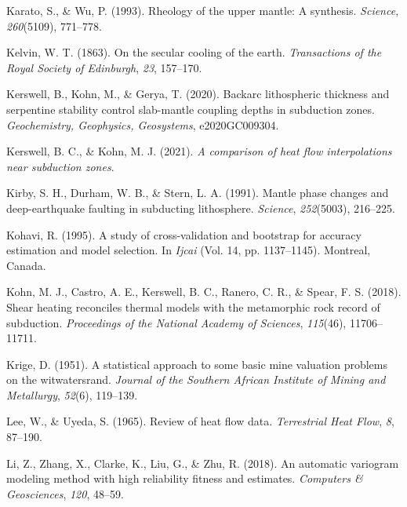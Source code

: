 \begin{CSLReferences}{1}{1}
\leavevmode{}%
Karato, S., \& Wu, P. (1993). Rheology of the upper mantle: A synthesis. \emph{Science}, \emph{260}(5109), 771--778.

\leavevmode{}%
Kelvin, W. T. (1863). On the secular cooling of the earth. \emph{Transactions of the Royal Society of Edinburgh}, \emph{23}, 157--170.

\leavevmode{}%
Kerswell, B., Kohn, M., \& Gerya, T. (2020). Backarc lithospheric thickness and serpentine stability control slab-mantle coupling depths in subduction zones. \emph{Geochemistry, Geophysics, Geosystems}, e2020GC009304.

\leavevmode{}%
Kerswell, B. C., \& Kohn, M. J. (2021). \emph{A comparison of heat flow interpolations near subduction zones}.

\leavevmode{}%
Kirby, S. H., Durham, W. B., \& Stern, L. A. (1991). Mantle phase changes and deep-earthquake faulting in subducting lithosphere. \emph{Science}, \emph{252}(5003), 216--225.

\leavevmode{}%
Kohavi, R. (1995). A study of cross-validation and bootstrap for accuracy estimation and model selection. In \emph{Ijcai} (Vol. 14, pp. 1137--1145). Montreal, Canada.

\leavevmode{}%
Kohn, M. J., Castro, A. E., Kerswell, B. C., Ranero, C. R., \& Spear, F. S. (2018). Shear heating reconciles thermal models with the metamorphic rock record of subduction. \emph{Proceedings of the National Academy of Sciences}, \emph{115}(46), 11706--11711.

\leavevmode{}%
Krige, D. (1951). A statistical approach to some basic mine valuation problems on the witwatersrand. \emph{Journal of the Southern African Institute of Mining and Metallurgy}, \emph{52}(6), 119--139.

\leavevmode{}%
Lee, W., \& Uyeda, S. (1965). Review of heat flow data. \emph{Terrestrial Heat Flow}, \emph{8}, 87--190.

\leavevmode{}%
Li, Z., Zhang, X., Clarke, K., Liu, G., \& Zhu, R. (2018). An automatic variogram modeling method with high reliability fitness and estimates. \emph{Computers \& Geosciences}, \emph{120}, 48--59.


\end{CSLReferences}
